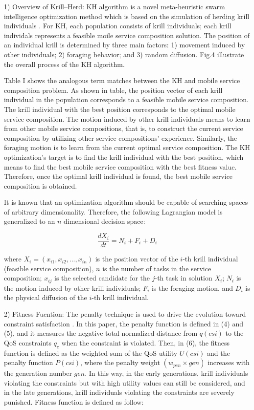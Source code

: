 \documentclass[10pt,journal,compsoc]{IEEEtran}
\begin{document}
​1) Overview of Krill–Herd: KH algorithm is a novel meta-heuristic swarm intelligence optimization method which is based on the simulation of herding krill individuals \cite{gandomi2012krill}. For KH, each population consists of krill individuals; each krill individals represents a feasible moile service composition solution. The position of an individual krill is determined by three main factors: 1) movement induced by other individuals; 2) foraging behavior; and 3) random diffusion. Fig.4 illustrate the overall process of the KH algorithm.

​Table I shows the analogous term matches between the KH and mobile service composition problem. As shown in table, the position vector of each krill individual in the population corresponds to a feasible mobile service composition. The krill individual with the best position corresponds to the optimal mobile service composition. The motion induced by other krill individuals means to learn from other mobile service compositions, that is, to construct the current service composition by utilizing other service compositions’ experience. Similarly, the foraging motion is to learn from the current optimal service composition. The KH optimization's target is to find the krill individual with the best position, which means to find the best mobile service composition with the best fitness value. Therefore, once the optimal krill individual is found, the best mobile service composition is obtained.

It is known that an optimization algorithm should be capable of searching spaces of arbitrary dimensionality. Therefore, the following Lagrangian model is generalized to an $n$ dimensional decision space:

\begin{equation}
\frac{dX_i}{dt} =N_i+F_i+D_i
\end{equation}

where $X_i = (x_{i1}, x_{i2}, . . . , x_{in})$ is the position vector of the $i$-th krill individual (feasible service composition), $n$ is the number of tasks in the service composition; $x_{ij}$ is the selected candidate for the $j$-th task in solution $X_i$; $N_i$ is the motion induced by other krill individuals; $F_i$ is the foraging motion, and $D_i$ is the physical diffusion of the $i$-th krill individual.

2) Fitness Fucntion: The penalty technique is used to drive the evolution toward constraint satisfaction \cite{gen1996survey}. In this paper, the penalty function is defined in (4) and (5), and it measures the negative total normalized distance from $q(csi)$ to the QoS constraints $q_c$ when the constraint is violated. Then, in (6), the fitness function is defined as the weighted sum of the QoS utility $U(csi)$ and the penalty function $P(csi)$, where the penalty weight $(w_{pen} × gen)$ increases with the generation number $gen$. In this way, in the early generations, krill individuals violating the constraints but with high utility values can still be considered, and in the late generations, krill individuals violating the constraints are severely punished. Fitness function is defined as follow: 
\end{document}
